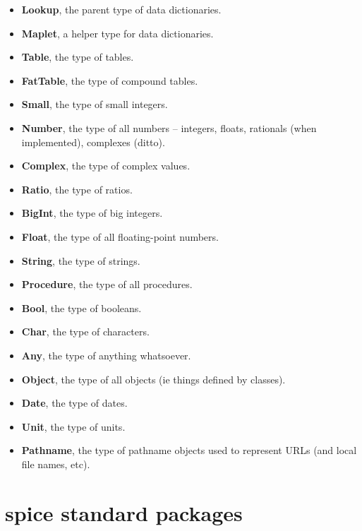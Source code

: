 \documentclass{report}
\begin{document}
\begin{itemize}\item {\bf Lookup}, the parent type of data dictionaries.

\item {\bf Maplet}, a helper type for data dictionaries.

\item {\bf Table}, the type of tables.

\item {\bf FatTable}, the type of compound tables.

\item {\bf Small}, the type of small integers.

\item {\bf Number}, the type of all numbers -- integers, floats, rationals (when
implemented), complexes (ditto).

\item {\bf Complex}, the type of complex values.

\item {\bf Ratio}, the type of ratios.

\item {\bf BigInt}, the type of big integers.

\item {\bf Float}, the type of all floating-point numbers.

\item {\bf String}, the type of strings.

\item {\bf Procedure}, the type of all procedures.

\item {\bf Bool}, the type of booleans.

\item {\bf Char}, the type of characters.

\item {\bf Any}, the type of anything whatsoever.

\item {\bf Object}, the type of all objects (ie things defined by classes).

\item {\bf Date}, the type of dates.

\item {\bf Unit}, the type of units.

\item {\bf Pathname}, the type of pathname objects used to represent URLs (and local
file names, etc).

\end{itemize}\chapter{spice standard packages}
\end{document}
